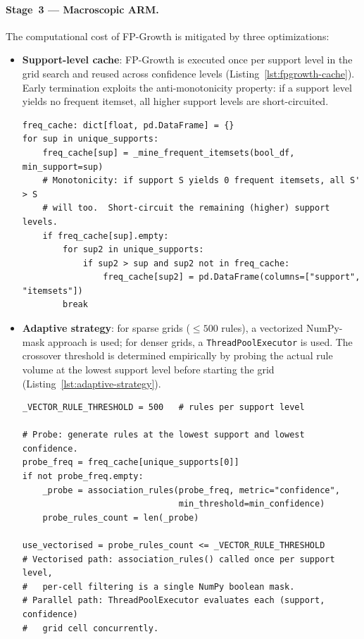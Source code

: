 \begin{itemize}
\end{itemize}

\paragraph{Stage~3 --- Macroscopic ARM.}
The computational cost of FP-Growth is mitigated by three optimizations:
\begin{itemize}
  \item \textbf{Support-level cache}: FP-Growth is executed once per support level in the grid search and reused across confidence levels (Listing~\ref{lst:fpgrowth-cache}).
  Early termination exploits the anti-monotonicity property: if a support level yields no frequent itemset, all higher support levels are short-circuited.

\begin{lstlisting}[style=pipeline,caption={FP-Growth cache with anti-monotone early termination (\texttt{src/macroscopic\_data\_mining.py}).},label={lst:fpgrowth-cache}]
freq_cache: dict[float, pd.DataFrame] = {}
for sup in unique_supports:
    freq_cache[sup] = _mine_frequent_itemsets(bool_df, min_support=sup)
    # Monotonicity: if support S yields 0 frequent itemsets, all S' > S
    # will too.  Short-circuit the remaining (higher) support levels.
    if freq_cache[sup].empty:
        for sup2 in unique_supports:
            if sup2 > sup and sup2 not in freq_cache:
                freq_cache[sup2] = pd.DataFrame(columns=["support", "itemsets"])
        break
\end{lstlisting}

  \item \textbf{Adaptive strategy}: for sparse grids ($\le 500$ rules), a vectorized NumPy-mask approach is used; for denser grids, a \texttt{ThreadPoolExecutor} is used.
  The crossover threshold is determined empirically by probing the actual rule volume at the lowest support level before starting the grid (Listing~\ref{lst:adaptive-strategy}).

\begin{lstlisting}[style=pipeline,caption={Adaptive strategy selection based on rule volume probing (\texttt{src/macroscopic\_data\_mining.py}).},label={lst:adaptive-strategy}]
_VECTOR_RULE_THRESHOLD = 500   # rules per support level

# Probe: generate rules at the lowest support and lowest confidence.
probe_freq = freq_cache[unique_supports[0]]
if not probe_freq.empty:
    _probe = association_rules(probe_freq, metric="confidence",
                               min_threshold=min_confidence)
    probe_rules_count = len(_probe)

use_vectorised = probe_rules_count <= _VECTOR_RULE_THRESHOLD
# Vectorised path: association_rules() called once per support level,
#   per-cell filtering is a single NumPy boolean mask.
# Parallel path: ThreadPoolExecutor evaluates each (support, confidence)
#   grid cell concurrently.
\end{lstlisting}

\end{itemize}

